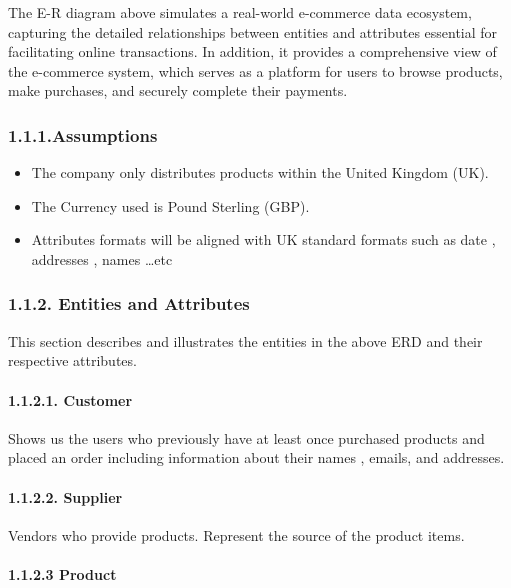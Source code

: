 \documentclass[
]{article}
\begin{document}
The E-R diagram above simulates a real-world e-commerce data ecosystem,
capturing the detailed relationships between entities and attributes
essential for facilitating online transactions. In addition, it provides
a comprehensive view of the e-commerce system, which serves as a
platform for users to browse products, make purchases, and securely
complete their payments.

\hypertarget{assumptions}{%
\subsubsection{1.1.1.Assumptions}\label{assumptions}}

\begin{itemize}
\item
  The company only distributes products within the United Kingdom (UK).
\item
  The Currency used is Pound Sterling (GBP).
\item
  Attributes formats will be aligned with UK standard formats such as
  date , addresses , names \ldots etc
\end{itemize}

\hypertarget{entities-and-attributes}{%
\subsubsection{1.1.2. Entities and
Attributes}\label{entities-and-attributes}}

This section describes and illustrates the entities in the above ERD and
their respective attributes.

\hypertarget{customer}{%
\paragraph{1.1.2.1. Customer}\label{customer}}

Shows us the users who previously have at least once purchased products
and placed an order including information about their names , emails,
and addresses.

\hypertarget{supplier}{%
\paragraph{1.1.2.2. Supplier}\label{supplier}}

Vendors who provide products. Represent the source of the product items.

\hypertarget{product}{%
\paragraph{1.1.2.3 Product}\label{product}}
\end{document}
